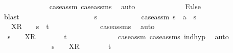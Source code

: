 \begin{isabellebody}
\ \ \ \ \ \ \ \ \ \ \ \ \isamarkupfalse%
\ case{\isacharunderscore}assm{}\ case{\isacharunderscore}assms{}{\isacharparenleft}{}{\isacharparenright}\ \isamarkupfalse%
\ auto\isanewline
\ \ \ \ \ \ \ \ \ \ \isamarkupfalse%
\ \isamarkupfalse%
\ False\isanewline
\ \ \ \ \ \ \ \ \ \ \ \ \isamarkupfalse%
\ blast\isanewline
\ \ \ \ \ \ \ \ \isamarkupfalse%
\isanewline
\ \ \ \ \ \ \ \ \ \ \isamarkupfalse%
\ s{\isacharprime}\isanewline
\ \ \ \ \ \ \ \ \ \ \isamarkupfalse%
\ case{\isacharunderscore}assm{}{\isacharcolon}\ {\isachardoublequoteopen}s\ {\isacharequal}\ a\ {\isacharhash}\ s{\isacharprime}{\isachardoublequoteclose}\isanewline
\ \ \ \ \ \ \ \ \ \ \isamarkupfalse%
\ \isamarkupfalse%
\ {\isachardoublequoteopen}{\isasymrho}\ {\isacharat}\ {\isacharbrackleft}X{\isacharbrackright}\isactrlsub R\ {\isacharhash}\ {\isasymsigma}\ {\isacharequal}\ s{\isacharprime}\ {\isacharat}\ t{\isachardoublequoteclose}\isanewline
\ \ \ \ \ \ \ \ \ \ \ \ \isamarkupfalse%
\ case{\isacharunderscore}assms{}{\isacharparenleft}{}{\isacharparenright}\ \isamarkupfalse%
\ auto\isanewline
\ \ \ \ \ \ \ \ \ \ \isamarkupfalse%
\ \isamarkupfalse%
\ {\isachardoublequoteopen}{\isasymexists}{\isasymsigma}{\isacharprime}{\isachardot}\ s{\isacharprime}\ {\isacharequal}\ {\isasymrho}\ {\isacharat}\ {\isacharbrackleft}X{\isacharbrackright}\isactrlsub R\ {\isacharhash}\ {\isasymsigma}{\isacharprime}\ {\isasymand}\ {\isasymsigma}\ {\isacharequal}\ {\isasymsigma}{\isacharprime}\ {\isacharat}\ t{\isachardoublequoteclose}\isanewline
\ \ \ \ \ \ \ \ \ \ \ \ \isamarkupfalse%
\ case{\isacharunderscore}assm{}\ case{\isacharunderscore}assms{}{\isacharparenleft}{}{\isacharparenright}\ ind{\isacharunderscore}hyp\ \isamarkupfalse%
\ auto\isanewline
\ \ \ \ \ \ \ \ \ \ \isamarkupfalse%
\ \isamarkupfalse%
\ {\isachardoublequoteopen}{\isasymexists}{\isasymsigma}{\isacharprime}{\isachardot}\ s{\isacharprime}\ {\isacharequal}\ {\isasymrho}\ {\isacharat}\ {\isacharbrackleft}X{\isacharbrackright}\isactrlsub R\ {\isacharhash}\ {\isasymsigma}{\isacharprime}\ {\isasymand}\ {\isasymsigma}\ {\isacharequal}\ {\isasymsigma}{\isacharprime}\ {\isacharat}\ t{\isachardoublequoteclose}\isanewline
\ \ \ \ \ \ \ \ \ \ \ \ \isamarkupfalse%

\end{isabellebody}

